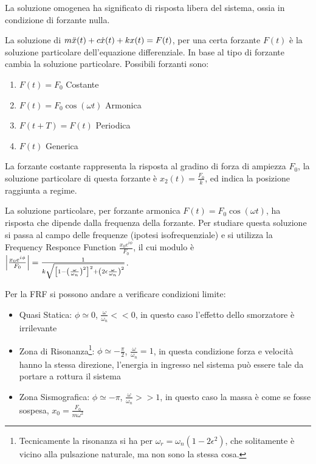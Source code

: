 La soluzione omogenea ha significato di risposta libera del sistema, ossia in condizione di forzante nulla.

La soluzione di \(m\Ddot{x}(t) + c\dot{x}(t) + k x(t) = F(t)\), per una certa forzante \(F(t)\) è la soluzione particolare  dell'equazione differenziale.
In base al tipo di forzante cambia la soluzione particolare.
Possibili forzanti sono:
\begin{enumerate}
    \item \(F(t) = F_0\) Costante
    \item \(F(t) = F_0 \cos{(\omega t)}\) Armonica
    \item \(F(t+T) = F(t) \) Periodica
    \item \(F(t)\) Generica
\end{enumerate}

La forzante costante rappresenta la risposta al gradino di forza di ampiezza \(F_0\), la soluzione particolare di questa forzante è \(x_2(t) = \frac{F_0}{k}\), ed indica la posizione raggiunta a regime.

La soluzione particolare, per forzante armonica \(F(t) = F_0 \cos{(\omega t)}\), ha risposta che dipende dalla frequenza della forzante.
Per studiare questa soluzione si passa al campo delle frequenze (ipotesi isofrequenziale) e si utilizza la Frequency Responce Function \( \frac{x_0 e^{i\phi}}{F_0} \), il cui modulo è \( \left|\frac{x_0 e^{i\phi}}{F_0}\right| = \frac{1}{k\sqrt{\left[1-\left(\frac{\omega}{\omega_n}\right)^2\right]^2+\left(2\epsilon \frac{\omega}{\omega_n}\right)^2}} \).

Per la FRF si possono andare a verificare condizioni limite:
\begin{itemize}
    \item Quasi Statica: \(\phi\simeq 0\), \(\frac{\omega}{\omega_n} << 0\), in questo caso l'effetto dello smorzatore è irrilevante
    \item Zona di Risonanza\footnote{Tecnicamente la risonanza si ha per \(\omega_r=\omega_n(1-2\epsilon^2)\), che solitamente è vicino alla pulsazione naturale, ma non sono la stessa cosa.}: \(\phi\simeq -\frac{\pi}{2}\), \(\frac{\omega}{\omega_n} = 1\), in questa condizione forza e velocità hanno la stessa direzione, l'energia in ingresso nel sistema può essere tale da portare a rottura il sistema
    \item Zona Sismografica: \(\phi\simeq -\pi\), \(\frac{\omega}{\omega_n} >> 1\), in questo caso la massa è come se fosse sospesa, \( x_0 = \frac{F_0}{m \omega^2} \)
\end{itemize}

